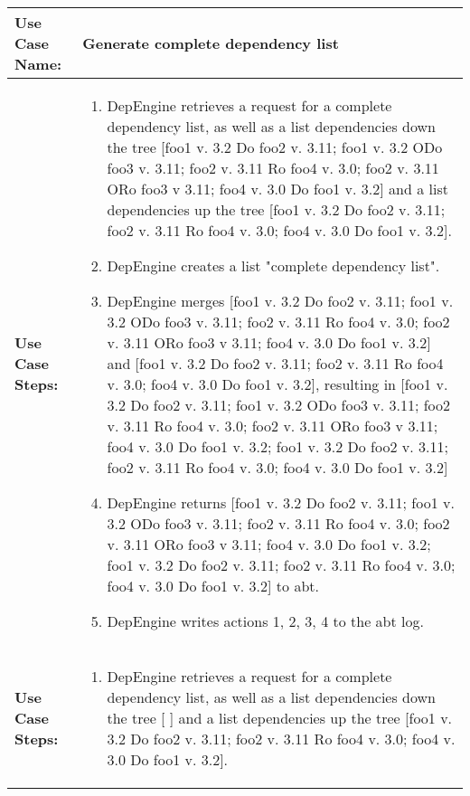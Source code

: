 \begin{tabularx}{\linewidth}{|l|X|}
\hline
\textbf{Use Case Name:} & \textbf{Generate complete dependency list} \\
\hline

\textbf{Use Case Steps:} & 
\begin{minipage}{\linewidth} 
 \vspace{0.05em}
  \begin{enumerate}
   \item DepEngine retrieves a request for a complete dependency list, as well as a list dependencies down the tree [foo1 v. 3.2 Do foo2 v. 3.11; foo1 v. 3.2 ODo foo3 v. 3.11; foo2 v. 3.11 Ro foo4 v. 3.0; foo2 v. 3.11 ORo foo3 v 3.11; foo4 v. 3.0 Do foo1 v. 3.2] and a list dependencies up the tree [foo1 v. 3.2 Do foo2 v. 3.11;  foo2 v. 3.11 Ro foo4 v. 3.0; foo4 v. 3.0 Do foo1 v. 3.2]. 
   \item DepEngine creates a list "complete dependency list".
   \item DepEngine merges [foo1 v. 3.2 Do foo2 v. 3.11; foo1 v. 3.2 ODo foo3 v. 3.11; foo2 v. 3.11 Ro foo4 v. 3.0; foo2 v. 3.11 ORo foo3 v 3.11; foo4 v. 3.0 Do foo1 v. 3.2] and [foo1 v. 3.2 Do foo2 v. 3.11;  foo2 v. 3.11 Ro foo4 v. 3.0; foo4 v. 3.0 Do foo1 v. 3.2], resulting in [foo1 v. 3.2 Do foo2 v. 3.11; foo1 v. 3.2 ODo foo3 v. 3.11; foo2 v. 3.11 Ro foo4 v. 3.0; foo2 v. 3.11 ORo foo3 v 3.11; foo4 v. 3.0 Do foo1 v. 3.2; foo1 v. 3.2 Do foo2 v. 3.11;  foo2 v. 3.11 Ro foo4 v. 3.0; foo4 v. 3.0 Do foo1 v. 3.2]   
   \item DepEngine returns [foo1 v. 3.2 Do foo2 v. 3.11; foo1 v. 3.2 ODo foo3 v. 3.11; foo2 v. 3.11 Ro foo4 v. 3.0; foo2 v. 3.11 ORo foo3 v 3.11; foo4 v. 3.0 Do foo1 v. 3.2; foo1 v. 3.2 Do foo2 v. 3.11;  foo2 v. 3.11 Ro foo4 v. 3.0; foo4 v. 3.0 Do foo1 v. 3.2] to abt.
   \item DepEngine writes actions 1, 2, 3, 4 to the abt log.
  \end{enumerate}
 \vspace{0.05em}
\end{minipage}
\\
\hline 
\textbf{Use Case Steps:} & 
\begin{minipage}{\linewidth} 
 \vspace{0.05em}
  \begin{enumerate}
   \item DepEngine retrieves a request for a complete dependency list, as well as a list dependencies down the tree [ ] and a list dependencies up the tree [foo1 v. 3.2 Do foo2 v. 3.11;  foo2 v. 3.11 Ro foo4 v. 3.0; foo4 v. 3.0 Do foo1 v. 3.2]. 

\end{enumerate}
\end{minipage}
\end{tabularx}
